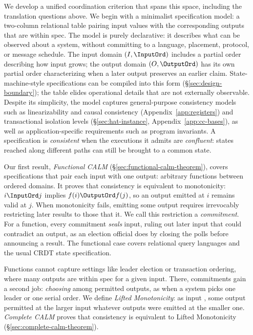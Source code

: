 We develop a unified coordination criterion that spans this space,
including the translation questions above.  We begin with a minimalist
specification model: a two-column relational table pairing input values with the
corresponding outputs that are within spec.  The model is purely declarative: it
describes what can be observed about a system, without committing to a
language, placement, protocol, or message schedule.  The input domain $(I,\InputOrd)$ includes a partial order
describing how input grows; the output domain $(O,\OutputOrd)$ has its own
partial order characterizing when a later output preserves an earlier claim.
State-machine-style specifications can be compiled into this form
(\S\ref{sec:design-boundary}); the table elides operational details that are not
externally observable.  Despite its simplicity, the model captures
general-purpose consistency models such as linearizability and causal
consistency (Appendix~\ref{app:registers}) and transactional
isolation levels (\S\ref{sec:hat-instance}, Appendix~\ref{app:cc-bases}), as
well as application-specific requirements
such as program invariants.  A
specification is \emph{consistent} when the executions it admits are
\emph{confluent}: states reached along different paths can still be brought to
a common state.

Our first result, \emph{Functional CALM}
(\S\ref{sec:functional-calm-theorem}), covers specifications that pair each
input with one output: arbitrary functions between ordered domains.  It proves
that consistency is equivalent to monotonicity: \(i\InputOrd j\) implies
\(f(i)\OutputOrd f(j)\), so an output emitted at \(i\) remains valid at \(j\).
When monotonicity fails, emitting some output requires irrevocably restricting
later results to those that \outrelbase it.  We call this restriction a
\emph{commitment}.  For a function, every commitment \emph{seals} input,
ruling out later input that could contradict an output, as an election
official does by closing the polls before announcing a result.  The functional
case covers relational query languages and the usual CRDT state
specification.

Functions cannot capture settings like leader election or transaction
ordering, where many outputs are within spec for a given input.  There,
commitments gain a second job: \emph{choosing} among permitted outputs, as
when a system picks one leader or one serial order.  We define \emph{Lifted
Monotonicity}: as input \ingrows, some output permitted at the larger input
\outrel whatever outputs were emitted at the smaller one.  \emph{Complete
CALM} proves that consistency is equivalent to Lifted Monotonicity
(\S\ref{sec:complete-calm-theorem}).

